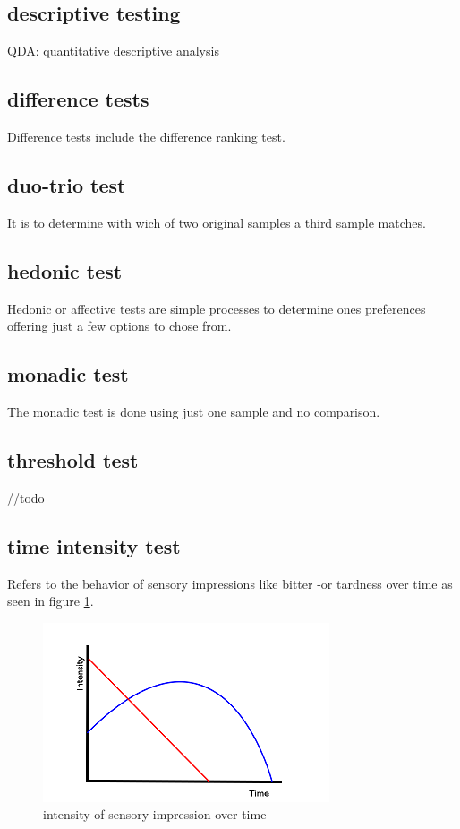 \documentclass[]{scrartcl}
\begin{document}
\subsection{descriptive testing}
QDA: quantitative descriptive analysis

\subsection{difference tests}
Difference tests include the difference ranking test.

\subsection{duo-trio test}
It is to determine with wich of two original samples a third sample matches.

\subsection{hedonic test}
Hedonic or affective tests are simple processes to determine ones preferences offering
just a few options to chose from.

\subsection{monadic test}
The monadic test is done using just one sample and no comparison.

\subsection{threshold test}
//todo

\subsection{time intensity test}
Refers to the behavior of sensory impressions like bitter -or tardness over time
as seen in figure \ref{fig:time-intensity}.
\begin{figure}[h]
	\centering
	\includegraphics{time-intensity.png}
	\caption{intensity of sensory impression over time}
	\label{fig:time-intensity}
\end{figure}
\end{document}
